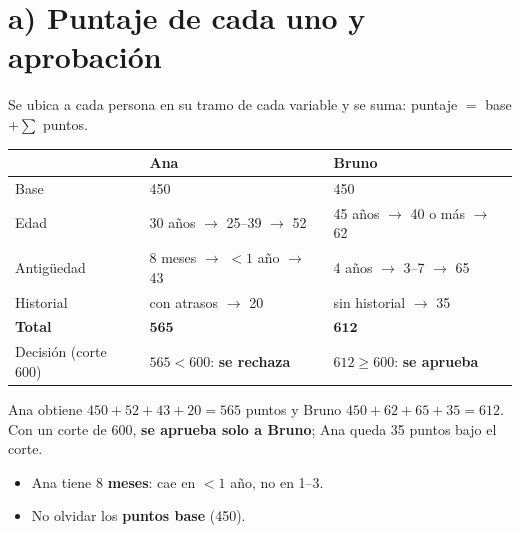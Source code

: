\documentclass[11pt,a4paper]{article}
\begin{document}
\section*{a) Puntaje de cada uno y aprobación}
Se ubica a cada persona en su tramo de cada variable y se suma: puntaje $=$ base $+\sum$ puntos.
\begin{center}
\renewcommand{\arraystretch}{1.3}
\begin{tabular}{lll}\toprule
 & Ana & Bruno\\\midrule
Base & 450 & 450\\
Edad & 30 años $\to$ 25--39 $\to$ 52 & 45 años $\to$ 40 o más $\to$ 62\\
Antigüedad & 8 meses $\to$ $<1$ año $\to$ 43 & 4 años $\to$ 3--7 $\to$ 65\\
Historial & con atrasos $\to$ 20 & sin historial $\to$ 35\\\midrule
\textbf{Total} & $\mathbf{565}$ & $\mathbf{612}$\\
Decisión (corte 600) & $565<600$: \textbf{se rechaza} & $612\ge600$: \textbf{se aprueba}\\\bottomrule
\end{tabular}
\end{center}
\begin{ejemplar}
Ana obtiene $450+52+43+20=565$ puntos y Bruno $450+62+65+35=612$. Con un corte de 600, \textbf{se aprueba solo a Bruno}; Ana queda 35 puntos bajo el corte.
\end{ejemplar}
\begin{trampa}
\begin{itemize}[leftmargin=*,itemsep=0pt,topsep=0pt]
\item Ana tiene 8 \textbf{meses}: cae en $<1$ año, no en 1--3.
\item No olvidar los \textbf{puntos base} (450).
\end{itemize}
\end{trampa}

\end{document}
